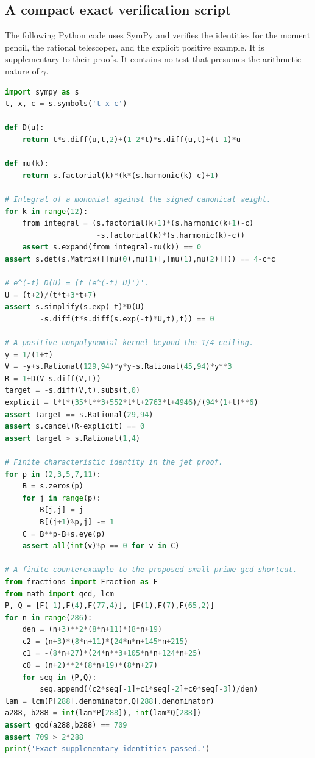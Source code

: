 \documentclass[11pt,a4paper]{article}
\theoremstyle{definition}
\theoremstyle{remark}
\numberwithin{equation}{section}
\begin{document}
\subsection{A compact exact verification script}
The following Python code uses SymPy and verifies the identities
for the moment pencil, the rational telescoper, and the explicit
positive example. It is supplementary to their proofs. It contains
no test that presumes the arithmetic nature of $\gamma$.
\begin{lstlisting}[language=Python]
import sympy as s
t, x, c = s.symbols('t x c')

def D(u):
    return t*s.diff(u,t,2)+(1-2*t)*s.diff(u,t)+(t-1)*u

def mu(k):
    return s.factorial(k)*(k*(s.harmonic(k)-c)+1)

# Integral of a monomial against the signed canonical weight.
for k in range(12):
    from_integral = (s.factorial(k+1)*(s.harmonic(k+1)-c)
                     -s.factorial(k)*(s.harmonic(k)-c))
    assert s.expand(from_integral-mu(k)) == 0
assert s.det(s.Matrix([[mu(0),mu(1)],[mu(1),mu(2)]])) == 4-c*c

# e^(-t) D(U) = (t (e^(-t) U)')'.
U = (t+2)/(t*t+3*t+7)
assert s.simplify(s.exp(-t)*D(U)
        -s.diff(t*s.diff(s.exp(-t)*U,t),t)) == 0

# A positive nonpolynomial kernel beyond the 1/4 ceiling.
y = 1/(1+t)
V = -y+s.Rational(129,94)*y*y-s.Rational(45,94)*y**3
R = 1+D(V-s.diff(V,t))
target = -s.diff(V,t).subs(t,0)
explicit = t*t*(35*t**3+552*t*t+2763*t+4946)/(94*(1+t)**6)
assert target == s.Rational(29,94)
assert s.cancel(R-explicit) == 0
assert target > s.Rational(1,4)

# Finite characteristic identity in the jet proof.
for p in (2,3,5,7,11):
    B = s.zeros(p)
    for j in range(p):
        B[j,j] = j
        B[(j+1)%p,j] -= 1
    C = B**p-B+s.eye(p)
    assert all(int(v)%p == 0 for v in C)

# A finite counterexample to the proposed small-prime gcd shortcut.
from fractions import Fraction as F
from math import gcd, lcm
P, Q = [F(-1),F(4),F(77,4)], [F(1),F(7),F(65,2)]
for n in range(286):
    den = (n+3)**2*(8*n+11)*(8*n+19)
    c2 = (n+3)*(8*n+11)*(24*n*n+145*n+215)
    c1 = -(8*n+27)*(24*n**3+105*n*n+124*n+25)
    c0 = (n+2)**2*(8*n+19)*(8*n+27)
    for seq in (P,Q):
        seq.append((c2*seq[-1]+c1*seq[-2]+c0*seq[-3])/den)
lam = lcm(P[288].denominator,Q[288].denominator)
a288, b288 = int(lam*P[288]), int(lam*Q[288])
assert gcd(a288,b288) == 709
assert 709 > 2*288
print('Exact supplementary identities passed.')
\end{lstlisting}
\end{document}
